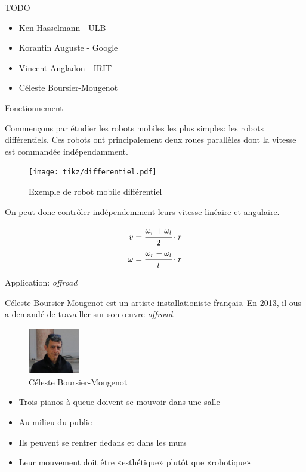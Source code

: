 \documentclass[french,ignorenonframetext,]{beamer}
\providecommand{\tightlist}{%
  \setlength{\itemsep}{0pt}\setlength{\parskip}{0pt}}
\begin{document}
TODO

\begin{itemize}
\tightlist
\item
  Ken Hasselmann - ULB
\item
  Korantin Auguste - Google
\item
  Vincent Angladon - IRIT
\item
  Céleste Boursier-Mougenot
\end{itemize}

\begin{frame}{Fonctionnement}

Commençons par étudier les robots mobiles les plus simples: les robots
différentiels. Ces robots ont principalement deux roues parallèles dont
la vitesse est commandée indépendamment.

\begin{figure}
\centering
\texttt{[image: tikz/differentiel.pdf]}
\caption{Exemple de robot mobile différentiel}
\end{figure}

\pause

On peut donc contrôler indépendemment leurs vitesse linéaire et
angulaire.

\[
\begin{aligned}
v      &= \cfrac{\omega_r + \omega_l}{2} \cdot r \\
\omega &= \cfrac{\omega_r - \omega_l}{l} \cdot r
\end{aligned}
\]

\end{frame}

\begin{frame}{Application: \emph{offroad}}

Céleste Boursier-Mougenot est un artiste installationiste français. En
2013, il ous a demandé de travailler sur son œuvre \emph{offroad}.

\begin{figure}
\centering
\includegraphics[height=2.00000cm]{imgs/celeste.jpg}
\caption{Céleste Boursier-Mougenot}
\end{figure}

\begin{itemize}
\tightlist
\item
  Trois pianos à queue doivent se mouvoir dans une salle
\item
  Au milieu du public
\item
  Ils peuvent se rentrer dedans et dans les murs
\item
  Leur mouvement doit être «esthétique» plutôt que «robotique»
\end{itemize}

\end{frame}
\end{document}
